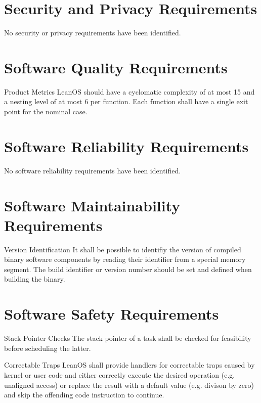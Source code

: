 %




\section{Security and Privacy Requirements}

No security or privacy requirements have been identified.

\section{Software Quality Requirements}

 {Product Metrics}{%
LeanOS should have a cyclomatic complexity of at most 15 and a nesting level of
at most 6 per function. Each function shall have a single exit point for the 
nominal case.
}{}%

\section{Software Reliability Requirements}

No software reliability requirements have been identified.

\section{Software Maintainability Requirements}

 {Version Identification}{%
It shall be possible to identifiy the version of compiled binary software
components by reading their identifier from a special memory segment.
}{
The build identifier or version number should be set and defined when building
the binary.
}%


\section{Software Safety Requirements}

 {Stack Pointer Checks}{%
The stack pointer of a task shall be checked for feasibility before scheduling
the latter.
}{
}%

 {Correctable Traps}{%
LeanOS shall provide handlers for correctable traps caused by kernel or user
code and either correctly execute the desired operation (e.g. unaligned access)
or replace the result with a default value (e.g. divison by zero) and skip the
offending code instruction to continue.
}{
}

